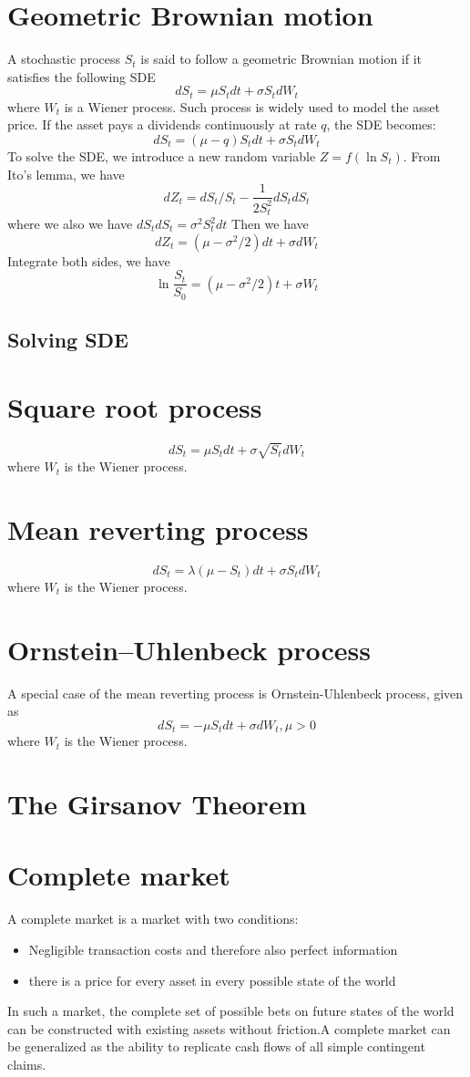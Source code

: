 \documentclass[a4paper,13pt]{report}
\begin{document}
\section{Geometric Brownian motion}
A stochastic process $S_t$ is said to follow a geometric Brownian motion if it satisfies the following SDE
$$dS_t = \mu S_t dt + \sigma S_t dW_t$$
where $W_t$ is a Wiener process.\cite{wiki:Geom} Such process is widely used to model the asset price. If the asset pays a dividends continuously at rate $q$, the SDE becomes:
$$dS_t = (\mu - q) S_t dt + \sigma S_t dW_t$$
To solve the SDE, we introduce a new random variable $Z=f(\ln S_t)$. From Ito's lemma, we have
$$dZ_t = dS_t/S_t - \frac{1}{2S_t^2}dS_tdS_t$$where we also we have $dS_tdS_t = \sigma^2S_t^2dt$
Then we have
$$dZ_t = (\mu - \sigma^2/2)dt + \sigma dW_t$$
Integrate both sides, we have $$\ln\frac{S_t}{S_0}=(\mu - \sigma^2/2)t + \sigma W_t$$

\subsection{Solving SDE}

\section{Square root process}
$$dS_t = \mu S_t dt + \sigma \sqrt{S_t}dW_t$$
where $W_t$ is the Wiener process. \cite{neftci2000introduction}\cite{wiki:CIR}
\section{Mean reverting process}
$$dS_t = \lambda(\mu - S_t)dt + \sigma S_t dW_t$$
where $W_t$ is the Wiener process. \cite{neftci2000introduction}
\section{Ornstein–Uhlenbeck process}
A special case of the mean reverting process is Ornstein-Uhlenbeck process, given as
$$dS_t = -\mu S_t dt +\sigma dW_t,\mu>0$$
where $W_t$ is the Wiener process.
\section{The Girsanov Theorem}




\section{Complete market}
A complete market  is a market with two conditions:
\begin{itemize}
    \item Negligible transaction costs and therefore also perfect information
    \item there is a price for every asset in every possible state of the world
\end{itemize}
In such a market, the complete set of possible bets on future states of the world can be constructed with existing assets without friction.A complete market can be generalized as the ability to replicate cash flows of all simple contingent claims.\cite{wiki:completemarket}
\end{document}
